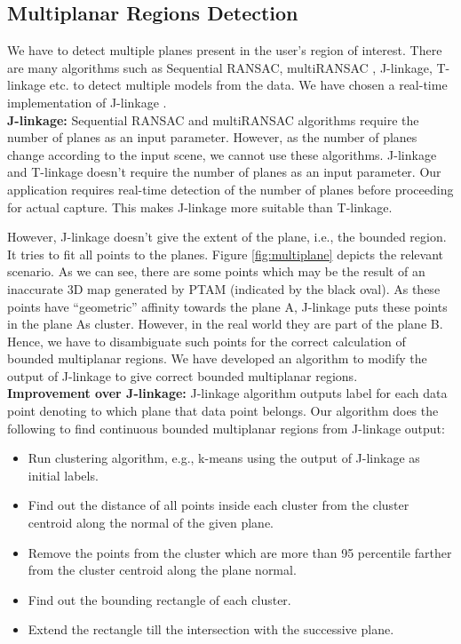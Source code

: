 \subsection{Multiplanar Regions Detection}
We have to detect multiple planes present in the user's region of
interest. There are many algorithms such as Sequential RANSAC\cite{Kanazawa},
multiRANSAC\cite{zuliani} , J-linkage\cite{jlinkage}, T-linkage\cite{tlinkage}
etc. to detect multiple models from the data. We have chosen a real-time
implementation of J-linkage \cite{realtimejlinkage}.\\
\textbf{J-linkage:} Sequential RANSAC and multiRANSAC algorithms require
the number of planes as an input parameter. However, as the number of planes
change according to the input scene, we cannot use these algorithms. J-linkage and T-linkage
doesn't require the number of planes as an input parameter. 
Our application requires real-time detection of the number of planes before proceeding for 
actual capture. This makes J-linkage more suitable than T-linkage.

However, J-linkage doesn't give the extent of the plane, i.e., the bounded
region. It tries to fit all points to the planes. Figure \ref{fig:multiplane}
depicts the relevant scenario. As we can see, there are some points which may
be the result of an inaccurate 3D map generated by PTAM (indicated by the black oval).
As these points have ``geometric'' affinity towards the plane A, J-linkage puts
these points in the plane A\textquotesingle s cluster. However, in the real world they
are part of the plane B. Hence, we have to disambiguate such points for
the correct calculation of bounded multiplanar regions. We have developed an
algorithm to modify the output of J-linkage to give correct bounded multiplanar regions.\\
\textbf{Improvement over J-linkage:} J-linkage algorithm outputs label
for each data point denoting to which plane that data point belongs. Our
algorithm does the following to find continuous bounded multiplanar regions
from J-linkage output:
\begin{itemize}
  \item Run clustering algorithm, e.g., k-means using the output of J-linkage
  as initial labels.
  \item Find out the distance of all points inside each cluster from the cluster
  centroid along the normal of the given plane.
  \item Remove the points from the cluster which are more than 95 percentile
  farther from the cluster centroid along the plane normal.
  \item Find out the bounding rectangle of each cluster.
  \item Extend the rectangle till the intersection with the successive plane.
\end{itemize}


